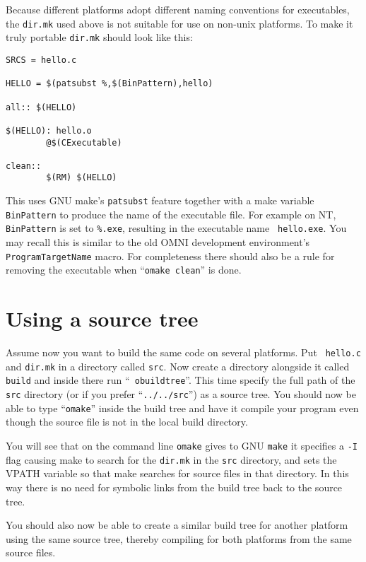 \documentclass[11pt]{article}
\begin{document}
Because different platforms adopt different naming conventions for executables,
the {\tt dir.mk} used above is not suitable for use on non-unix platforms.  To
make it truly portable {\tt dir.mk} should look like this:

\begin{verbatim}
SRCS = hello.c

HELLO = $(patsubst %,$(BinPattern),hello)

all:: $(HELLO)

$(HELLO): hello.o
        @$(CExecutable)

clean::
        $(RM) $(HELLO)
\end{verbatim}

This uses GNU make's {\tt patsubst} feature together with a make variable {\tt
BinPattern} to produce the name of the executable file.  For example on NT,
{\tt BinPattern} is set to {\tt \%.exe}, resulting in the executable name {\tt
hello.exe}.  You may recall this is similar to the old OMNI development
environment's {\tt ProgramTargetName} macro.  For completeness there should
also be a rule for removing the executable when ``{\tt omake clean}'' is done.

\section{Using a source tree}

Assume now you want to build the same code on several platforms.  Put {\tt
hello.c} and {\tt dir.mk} in a directory called {\tt src}.  Now create a
directory alongside it called {\tt build} and inside there run ``{\tt
obuildtree}''.  This time specify the full path of the {\tt src} directory (or
if you prefer ``{\tt ../../src}'') as a source tree.  You should now be able to
type ``{\tt omake}'' inside the build tree and have it compile your program
even though the source file is not in the local build directory.

You will see that on the command line {\tt omake} gives to GNU {\tt make} it
specifies a {\tt -I} flag causing make to search for the {\tt dir.mk} in the
{\tt src} directory, and sets the VPATH variable so that make searches for
source files in that directory.  In this way there is no need for symbolic
links from the build tree back to the source tree.

You should also now be able to create a similar build tree for another platform
using the same source tree, thereby compiling for both platforms from the same
source files.
\end{document}
